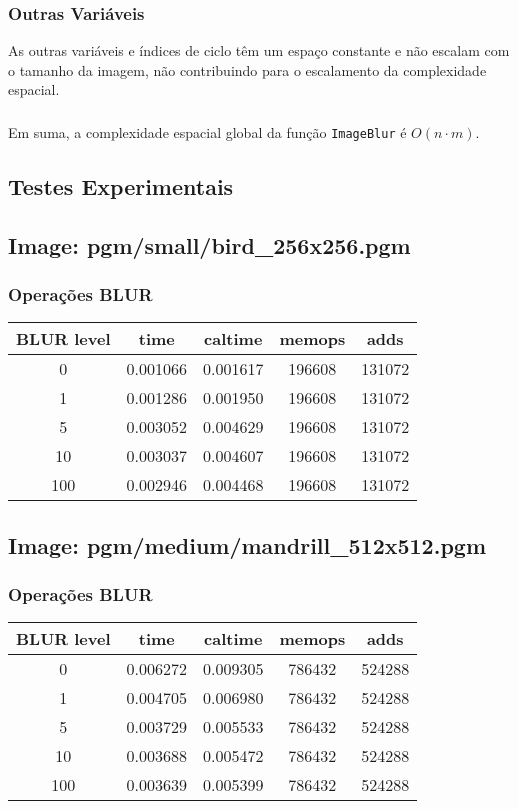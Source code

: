 \documentclass{report}
\begin{document}
\subsubsection{Outras Variáveis}
As outras variáveis e índices de ciclo têm um espaço constante e não escalam com o tamanho da imagem, não contribuindo para o escalamento da 
complexidade espacial.
\par
\subsubsection*{}
Em suma, a complexidade espacial global da função \texttt{ImageBlur} é \(O(n \cdot m)\).

\subsection{Testes Experimentais}

\subsection*{Image: pgm/small/bird\_256x256.pgm}

\subsubsection*{Operações BLUR}
\begin{tabular}{ccccc}
\toprule
\textbf{BLUR level} & \textbf{time} & \textbf{caltime} & \textbf{memops} & \textbf{adds} \\
\midrule
0 & 0.001066 & 0.001617 & 196608 & 131072 \\
1 & 0.001286 & 0.001950 & 196608 & 131072 \\
5 & 0.003052 & 0.004629 & 196608 & 131072 \\
10 & 0.003037 & 0.004607 & 196608 & 131072 \\
100 & 0.002946 & 0.004468 & 196608 & 131072 \\
\bottomrule
\end{tabular}

\subsection*{Image: pgm/medium/mandrill\_512x512.pgm}

\subsubsection*{Operações BLUR}
\begin{tabular}{ccccc}
\toprule
\textbf{BLUR level} & \textbf{time} & \textbf{caltime} & \textbf{memops} & \textbf{adds} \\
\midrule
0 & 0.006272 & 0.009305 & 786432 & 524288 \\
1 & 0.004705 & 0.006980 & 786432 & 524288 \\
5 & 0.003729 & 0.005533 & 786432 & 524288 \\
10 & 0.003688 & 0.005472 & 786432 & 524288 \\
100 & 0.003639 & 0.005399 & 786432 & 524288 \\
\bottomrule
\end{tabular}
\end{document}
